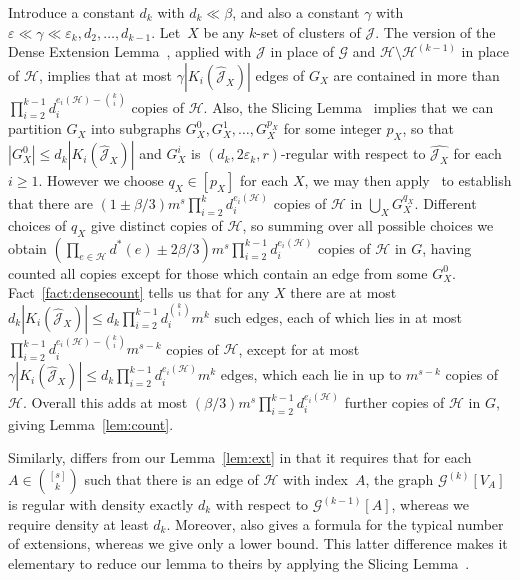 \documentclass[12pt,a4paper]{amsart}
\let\eps\varepsilon
\newcommand{\Hy}{\mathcal{H}}
\newcommand{\cG}{\mathcal{G}}
\newcommand{\cJ}{\mathcal{J}}
\newcommand{\reld}{d^*}
\begin{document}
Introduce a constant $d_k$ with $d_k \ll \beta$, and also a constant
$\gamma$ with $\eps \ll \gamma \ll \eps_k, d_2, \dots, d_{k-1}$. Let~$X$ be
any $k$-set of clusters of $\cJ$. The version of the Dense Extension
Lemma~\cite[Lemma~7]{CFKO}, applied with $\cJ$ in place of $\cG$ and
$\mathcal{H} \setminus \mathcal{H}^{(k-1)}$ in place of $\mathcal{H}$,
implies that at most $\gamma |K_i(\hat{\cJ}_X)|$ edges of $G_X$ are
contained in more than $\prod_{i = 2}^{k-1} d_i^{e_i(\mathcal{H}) -
  \binom{k}{i}}$ copies of $\mathcal{H}$. Also, the Slicing
Lemma~\cite[Lemma~8]{CFKO} implies that we can partition $G_X$ into
subgraphs $G^0_X, G^1_X, \dots, G^{p_X}_X$ for some integer $p_X$, so that
$|G^0_X| \leq d_k |K_i(\hat{\cJ}_X)|$ and $G^i_X$ is $(d_k,2\eps_k,
r)$-regular with respect to $\hat{\cJ_X}$ for each $i \geq 1$.  However we
choose $q_X \in [p_X]$ for each $X$, we may then apply~\cite[Lemma~4]{CFKO}
to establish that there are $(1 \pm \beta/3) m^s \prod_{i=2}^{k}
d_i^{e_i(\Hy)}$ copies of $\mathcal{H}$ in $\bigcup_X G^{q_X}_X$.
Different choices of $q_X$ give distinct copies of $\mathcal{H}$, so
summing over all possible choices we obtain $(\prod_{e \in \mathcal{H}}
\reld(e) \pm 2\beta/3) m^s \prod_{i=2}^{k-1} d_i^{e_i(\Hy)}$ copies of
$\mathcal{H}$ in $G$, having counted all copies except for those which
contain an edge from some $G^0_X$. Fact~\ref{fact:densecount} tells us that
for any $X$ there are at most $d_k |K_i(\hat{\cJ}_X)| \leq
d_k\prod_{i=2}^{k-1} d_i^{\binom{k}{i}} m^k$ such edges, each of which lies
in at most $\prod_{i=2}^{k-1} d_i^{e_i(\mathcal{H}) - \binom{k}{i}}
m^{s-k}$ copies of $\mathcal{H}$, except for at most $\gamma
|K_i(\hat{\cJ}_X)| \leq d_k \prod_{i=2}^{k-1} d_i^{e_i(\Hy)} m^k$ edges,
which each lie in up to $m^{s-k}$ copies of $\mathcal{H}$. Overall this
adds at most $(\beta/3) m^s \prod_{i=2}^{k-1} d_i^{e_i(\Hy)}$ further
copies of $\mathcal{H}$ in $G$, giving Lemma~\ref{lem:count}.

\smallskip

Similarly, \cite[Lemma~4.6]{lcycles} differs from our Lemma~\ref{lem:ext}
in that it requires that for each $A\in \binom{[s]}{k}$ such that there is an edge of
$\Hy$ with index~$A$, the graph $\cG^{(k)}[V_A]$ is regular with density
exactly $d_k$ with respect to $\cG^{(k-1)}[A]$, whereas we require density
at least $d_k$. Moreover, \cite[Lemma~4.6]{lcycles} also gives a
formula for the typical number of extensions, whereas we give only a lower
bound. This latter difference makes it elementary to reduce our lemma to theirs by applying the Slicing
Lemma~\cite[Lemma~8]{CFKO}.
\end{document}
